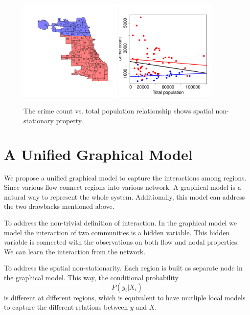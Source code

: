 \begin{figure}[h]
\centering
\includegraphics[width=0.45\textwidth]{fig/north-south-split.pdf}
\includegraphics[width=0.45\textwidth]{fig/crime-pop.pdf}
\caption{The crime count vs. total population relationship shows spatial non-stationary property.}
\label{fig:chi-crime}
\end{figure}





\section{A Unified Graphical Model}

We propose a unified graphical model to capture the interactions among regions. Since various flow connect regions into various network. A graphical model is a natural way to represent the whole system. Additionally, this model can address the two drawbacks mentioned above.

To address the non-trivial definition of interaction. In the graphical model we model the interaction of two communities is a hidden variable. This hidden variable is connected with the observations on both flow and nodal properties. We can learn the interaction from the network.

To address the spatial non-stationarity. Each region is built as separate node in the graphical model. This way, the conditional probability 
\[ P(y_i | X_i) \]
is different at different regions, which is equivalent to have mutliple local models to capture the different relations between $y$ and $X$.





